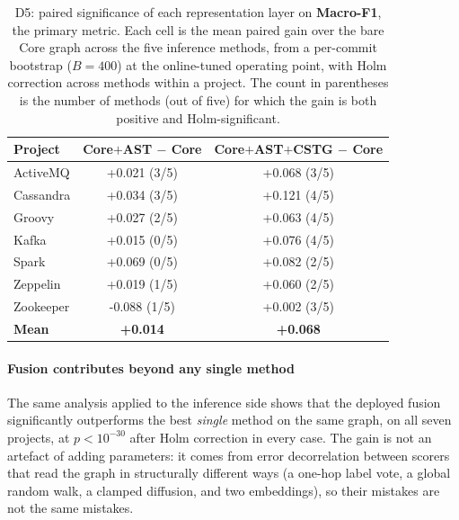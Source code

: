 \documentclass[final,5p,times,twocolumn]{elsarticle}
\theoremstyle{plain}
\begin{document}
\begin{table}[t]\centering\small\setlength{\tabcolsep}{5pt}
\caption{D5: paired significance of each representation layer on \textbf{Macro-F1}, the primary metric. Each cell is the mean paired gain over the bare Core graph across the five inference methods, from a per-commit bootstrap ($B=400$) at the online-tuned operating point, with Holm correction across methods within a project. The count in parentheses is the number of methods (out of five) for which the gain is both positive and Holm-significant.}
\label{tab:d5_layer_mf1}
\begin{tabular}{lcc}
\toprule
Project & Core$+$AST $-$ Core & Core$+$AST$+$CSTG $-$ Core \\ \midrule
ActiveMQ & +0.021 (3/5) & +0.068 (3/5) \\
Cassandra & +0.034 (3/5) & +0.121 (4/5) \\
Groovy & +0.027 (2/5) & +0.063 (4/5) \\
Kafka & +0.015 (0/5) & +0.076 (4/5) \\
Spark & +0.069 (0/5) & +0.082 (2/5) \\
Zeppelin & +0.019 (1/5) & +0.060 (2/5) \\
Zookeeper & -0.088 (1/5) & +0.002 (3/5) \\
\midrule \textbf{Mean} & \textbf{+0.014} & \textbf{+0.068} \\
\bottomrule
\end{tabular}
\end{table}

\paragraph{Fusion contributes beyond any single method} The same analysis applied to
the inference side shows that the deployed fusion significantly outperforms the best
\emph{single} method on the same graph, on all seven projects, at $p<10^{-30}$ after
Holm correction in every case. The gain is not an artefact of adding parameters: it
comes from error decorrelation between scorers that read the graph in structurally
different ways (a one-hop label vote, a global random walk, a clamped diffusion, and
two embeddings), so their mistakes are not the same mistakes.
\end{document}
